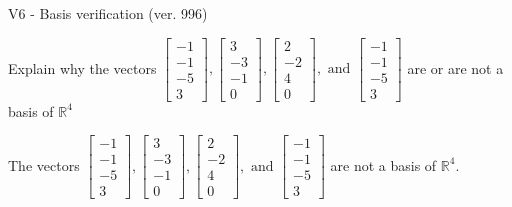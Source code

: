\begin{exercise}
  \begin{exerciseTitle}V6 - Basis verification (ver. 996)\end{exerciseTitle}
  \begin{exerciseStatement}
    Explain why the vectors \(\left[\begin{array}{r}
-1 \\
-1 \\
-5 \\
3
\end{array}\right] , \left[\begin{array}{r}
3 \\
-3 \\
-1 \\
0
\end{array}\right] , \left[\begin{array}{r}
2 \\
-2 \\
4 \\
0
\end{array}\right] , \text{ and } \left[\begin{array}{r}
-1 \\
-1 \\
-5 \\
3
\end{array}\right]\) are or are not a basis of \(\mathbb{R}^4\)	


  \end{exerciseStatement}
  \begin{exerciseAnswer}
   The vectors \(\left[\begin{array}{r}
-1 \\
-1 \\
-5 \\
3
\end{array}\right] , \left[\begin{array}{r}
3 \\
-3 \\
-1 \\
0
\end{array}\right] , \left[\begin{array}{r}
2 \\
-2 \\
4 \\
0
\end{array}\right] , \text{ and } \left[\begin{array}{r}
-1 \\
-1 \\
-5 \\
3
\end{array}\right]\) 
  	 are not  a basis of \(\mathbb{R}^4\).
  


  \end{exerciseAnswer}
\end{exercise}